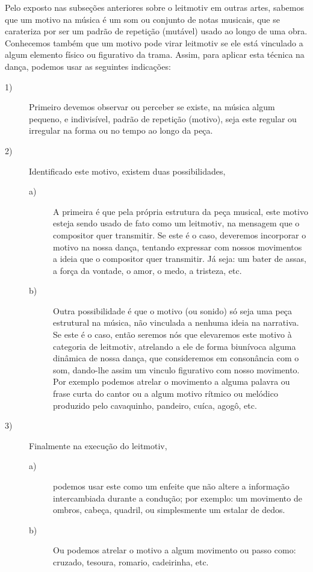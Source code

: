 Pelo exposto nas subseções anteriores sobre o leitmotiv em outras artes,
sabemos que um motivo na música é um som ou conjunto de notas musicais,
que se carateriza por ser um padrão de repetição (mutável) usado ao longo de uma obra.
Conhecemos também que um motivo pode virar leitmotiv se ele está vinculado a algum elemento físico ou figurativo da trama.
Assim, para aplicar esta técnica na dança, podemos usar as seguintes indicações:
\begin{description}
\item[1)] Primeiro devemos observar ou perceber se existe, na música algum pequeno, e indivisível, padrão de repetição (motivo), 
seja este regular ou irregular na forma ou no tempo ao longo da peça.
\item[2)] Identificado este motivo, existem duas possibilidades, 
\begin{description}
\item[a)] A primeira é que pela própria estrutura da peça musical, este motivo esteja sendo usado de fato como um leitmotiv, 
na mensagem que o compositor quer transmitir.
Se este é o caso, deveremos incorporar o motivo na nossa dança, 
tentando expressar com nossos movimentos a ideia que o compositor quer transmitir.
Já seja: um bater de assas, a força da vontade, o amor, o medo, a tristeza, etc.
\item[b)] Outra possibilidade é que o motivo (ou sonido) só seja uma peça estrutural na música, 
não vinculada a nenhuma ideia na narrativa.
Se este é o caso, então seremos nós que elevaremos este motivo à categoria de leitmotiv,
atrelando a ele de forma biunívoca alguma dinâmica de nossa dança, que consideremos em consonância com o som, 
dando-lhe assim um vinculo figurativo com nosso movimento.
Por exemplo podemos atrelar o movimento a alguma palavra ou frase curta do cantor ou a 
algum motivo rítmico ou melódico produzido pelo cavaquinho, 
pandeiro, cuíca, agogô, etc.
\end{description}
\item[3)] Finalmente na execução do leitmotiv,
\begin{description} 
\item[a)] podemos usar este como um enfeite que não altere a informação intercambiada durante a condução;
por exemplo: um movimento de ombros, cabeça, quadril, ou simplesmente um estalar de dedos. 
\item[b)] Ou podemos atrelar o motivo a algum movimento ou passo como: cruzado, tesoura, romario, cadeirinha, etc.  
\end{description}
\end{description}

